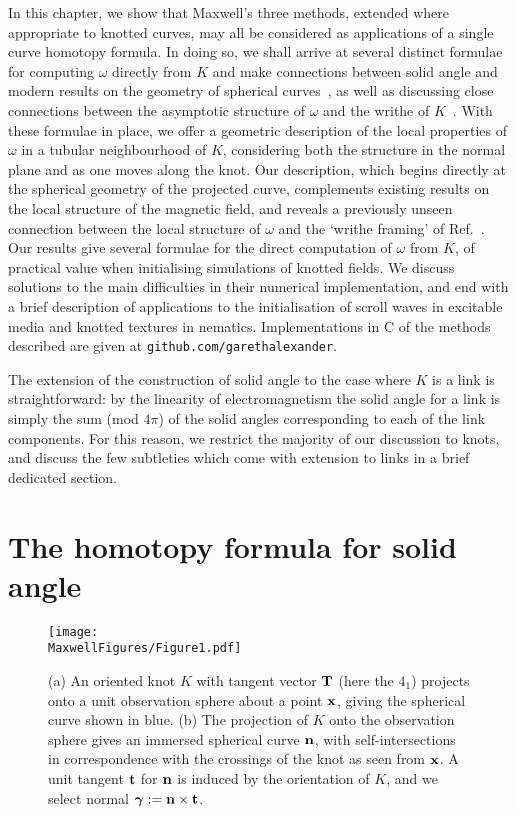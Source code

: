     In this chapter, we show that Maxwell's three methods, extended where appropriate to knotted curves, may all be considered as applications of a single curve homotopy formula. In doing so, we shall arrive at several distinct formulae for computing $\omega$ directly from $K$ and make connections between solid angle and modern results on the geometry of spherical curves~\citep{Levi1994,Arnold1995}, as well as discussing close connections between the asymptotic structure of $\omega$ and the writhe of $K$~\citep{Fuller1978,Dennis2005}. With these formulae in place, we offer a geometric description of the local properties of $\omega$ in a tubular neighbourhood of $K$, considering both the structure in the normal plane and as one moves along the knot. Our description, which begins directly at the spherical geometry of the projected curve, complements existing results on the local structure of the magnetic field, and reveals a previously unseen connection between the local structure of $\omega$ and the `writhe framing' of Ref.~\citep{Dennis2005}. 
    Our results give several formulae for the direct computation of $\omega$ from $K$, of practical value when initialising simulations of knotted fields. We discuss solutions to the main difficulties in their numerical implementation, and end with a brief description of applications to the initialisation of scroll waves in excitable media and knotted textures in nematics. Implementations in C of the methods described are given at \verb=github.com/garethalexander=.

    The extension of the construction of solid angle to the case where $K$ is a link is straightforward: by the linearity of electromagnetism the solid angle for a link is simply the sum (mod $4\pi$) of the solid angles corresponding to each of the link components. For this reason, we restrict the majority of our discussion to knots, and discuss the few subtleties which come with extension to links in a brief dedicated section.

    \section{The homotopy formula for solid angle} 
    \label{sec:CurveIsotopies}

    \begin{figure}[t]
        \centering	
        \texttt{[image: \\MaxwellFigures/Figure1.pdf]}
        \caption{(a) An oriented knot $K$ with tangent vector $\bf T$ (here the $4_1$) projects onto a unit observation sphere about a point $\bf x$, giving the spherical curve shown in blue. (b) The projection of $K$ onto the observation sphere gives an immersed spherical curve $\bf n$, with self-intersections in correspondence with the crossings of the knot as seen from $\bf x$. A unit tangent $\bf t$ for $\bf n$ is induced by the orientation of $K$, and we select normal $\boldsymbol{\gamma} := \bf n \times \bf t$.}
        \label{fig:Knot} 
    \end{figure}

